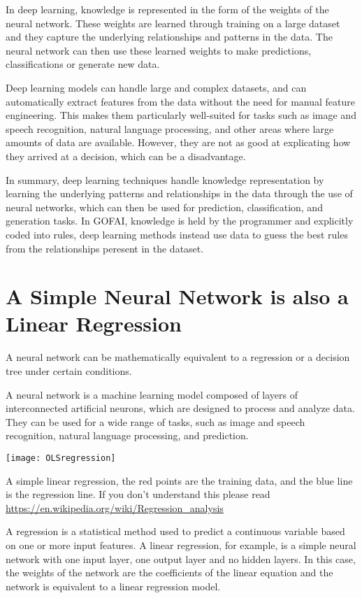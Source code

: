 In deep learning, knowledge is represented in the form of the weights of the neural network. These weights are learned through training on a large dataset and they capture the underlying relationships and patterns in the data. The neural network can then use these learned weights to make predictions, classifications or generate new data.

Deep learning models can handle large and complex datasets, and can automatically extract features from the data without the need for manual feature engineering. This makes them particularly well-suited for tasks such as image and speech recognition, natural language processing, and other areas where large amounts of data are available. However, they are not as good at explicating how they arrived at a decision, which can be a disadvantage.

In summary, deep learning techniques handle knowledge representation by learning the underlying patterns and relationships in the data through the use of neural networks, which can then be used for prediction, classification, and generation tasks. In GOFAI, knowledge is held by the programmer and explicitly coded into rules, deep learning methods instead use data to guess the best rules from the relationships peresent in the dataset. 

\section{A Simple Neural Network is also a Linear Regression}

A neural network can be mathematically equivalent to a regression or a decision tree under certain conditions.

A neural network is a machine learning model composed of layers of interconnected artificial neurons, which are designed to process and analyze data. They can be used for a wide range of tasks, such as image and speech recognition, natural language processing, and prediction.

\begin{marginfigure}[-5.5cm]
	\texttt{[image: OLSregression]}
        \caption{A simple linear regression, the red points are the training data, and the blue line is the regression line. If you don't understand this please read \url{https://en.wikipedia.org/wiki/Regression_analysis}}
\end{marginfigure}


A regression is a statistical method used to predict a continuous variable based on one or more input features. A linear regression, for example, is a simple neural network with one input layer, one output layer and no hidden layers. In this case, the weights of the network are the coefficients of the linear equation and the network is equivalent to a linear regression model.

